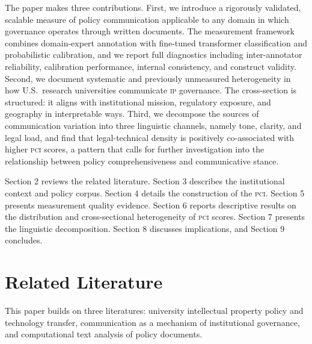 \documentclass[12pt]{article}
\newcommand{\PCI}{\textsc{pci}}
\newcommand{\IP}{\textsc{ip}}
\begin{document}
The paper makes three contributions.  First, we introduce a rigorously validated,
scalable measure of policy communication applicable to any domain in which governance
operates through written documents.  The measurement framework combines domain-expert
annotation with fine-tuned transformer classification and probabilistic calibration,
and we report full diagnostics including inter-annotator reliability, calibration
performance, internal consistency, and construct validity.  Second, we document
systematic and previously unmeasured heterogeneity in how U.S.\ research universities
communicate \IP{} governance.  The cross-section is structured: it aligns with
institutional mission, regulatory exposure, and geography in interpretable ways.
Third, we decompose the sources of communication variation into three linguistic
channels, namely tone, clarity, and legal load, and find that legal-technical density
is positively co-associated with higher \PCI{} scores, a pattern that calls for
further investigation into the relationship between policy comprehensiveness and
communicative stance.

Section 2 reviews the related literature.  Section 3 describes the institutional
context and policy corpus.  Section 4 details the construction of the \PCI.
Section 5 presents measurement quality evidence.  Section 6 reports descriptive
results on the distribution and cross-sectional heterogeneity of \PCI{} scores.
Section 7 presents the linguistic decomposition.  Section 8 discusses implications,
and Section 9 concludes.

\section{Related Literature}

This paper builds on three literatures: university intellectual property policy and
technology transfer, communication as a mechanism of institutional governance, and
computational text analysis of policy documents.
\end{document}

